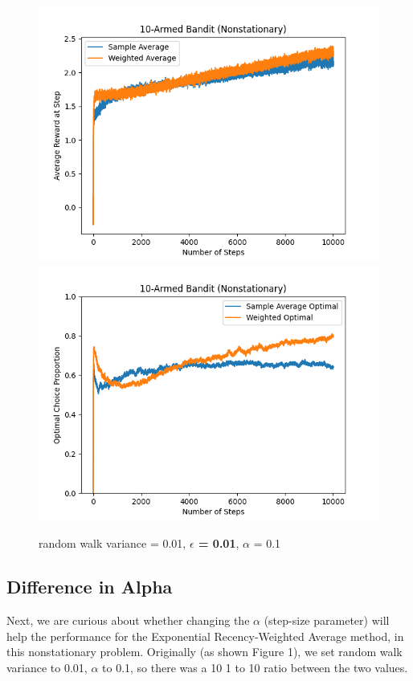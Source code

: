 \documentclass{article}
\begin{document}
\begin{figure}[h!]
\centering
\includegraphics[scale=.6]{RL_A1_pics/epsilon/0.01.png}
\includegraphics[scale=.6]{RL_A1_pics/epsilon/optimal/0.01.png}
\caption{random walk variance = 0.01, \textbf{$\epsilon$ = 0.01}, $\alpha$ = 0.1}
\label{fig:10-Armed1}
\end{figure}


\subsection{Difference in Alpha}
Next, we are curious about whether changing the $\alpha$ (step-size parameter) will help the performance for the Exponential Recency-Weighted Average method, in this nonstationary problem. Originally (as shown Figure 1), we set random walk variance to 0.01, $\alpha$ to 0.1, so there was a 10 1 to 10 ratio between the two values. 
\end{document}

